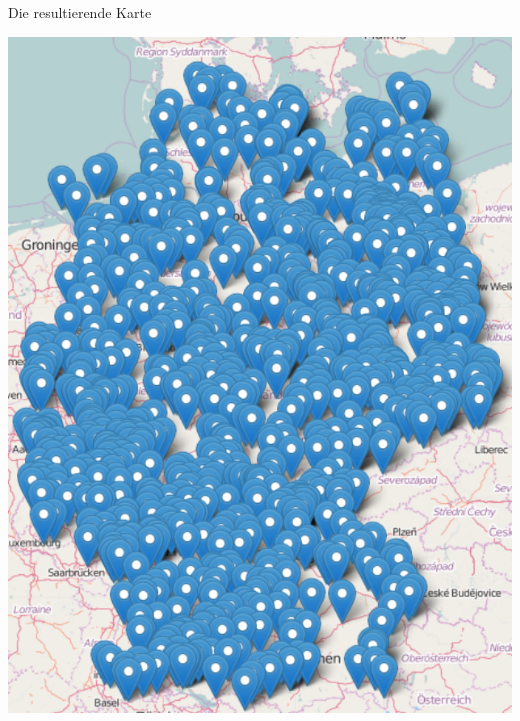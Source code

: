 \documentclass[ignorenonframetext,]{beamer}
\begin{document}
\begin{frame}{Die resultierende Karte}
\protect\hypertarget{die-resultierende-karte}{}

\includegraphics{figure/Germany_Campsites.PNG}

\end{frame}
\end{document}

